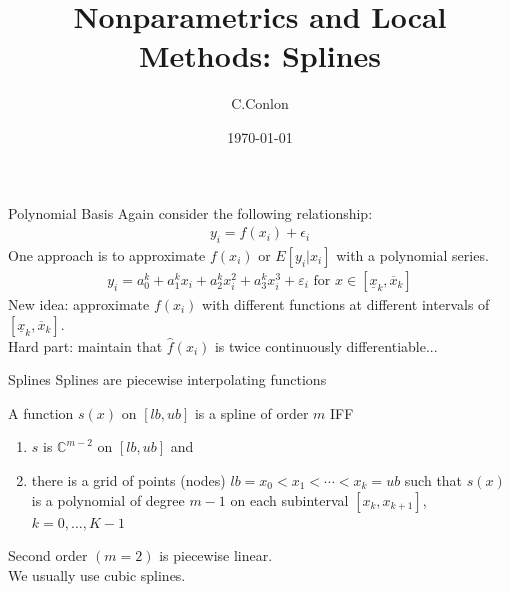 \documentclass[11pt,handout,xcolor=pdftex,dvipsnames,table,mathserif,aspectratio=169]{beamer}
\title [Nonparametrics]{Nonparametrics and Local Methods: Splines}
\author{C.Conlon}
\institute{Applied Econometrics}
\date{\today}
\begin{document}
\begin{frame}
\titlepage
\end{frame}

\begin{frame}{Polynomial Basis}
Again consider the following relationship:
\begin{align*}
y_i = f(x_i) + \epsilon_i
\end{align*}
One approach is to approximate $f(x_i)$ or $E[y_i | x_i]$ with a \alert{polynomial series}.
\begin{align*}
y_i = a_0^k  + a_1^k x_i + a_2^k x_i^2 + a_3^k x_i^3+ \varepsilon_i \text{ for } x \in [\underline{x}_k,\overline{x}_k]
\end{align*}
New idea: approximate $f(x_i)$ with \alert{different functions} at different intervals of $ [\underline{x}_k,\overline{x}_k]$.\\
Hard part: maintain that $\hat{f}(x_i)$ is twice continuously differentiable...
\end{frame}


\begin{frame}{Splines}
Splines are piecewise interpolating functions
\begin{definition} 
A function $s(x)$ on $[lb,ub]$ is a spline of order $m$ IFF
\begin{enumerate}
\item $s$ is $\mathbb{C}^{m-2}$ on $[lb,ub]$ and 
\item there is a grid of points (nodes) $lb = x_0 < x_1 < \cdots < x_k = ub$ such that $s(x)$ is a polynomial of degree $m-1$ on each subinterval $[x_k, x_{k+1}]$, $k = 0,\ldots,K-1$
\end{enumerate}
\end{definition}
Second order $(m=2)$ is piecewise linear.\\
We usually use cubic splines.
\end{frame}
\end{document}
